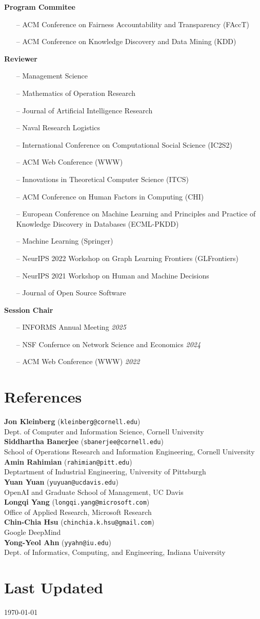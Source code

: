 \documentclass[margin]{res}
\newcommand{\field}[2]{\noindent \textbf{#1} \hfill #2 \\}
\newcommand{\referee}[3]{\textbf{#1} (\texttt{#3})\\{#2}\smallskip \\}
\begin{document}
\begin{resume}
	\field{Program Commitee}{}{
	\begin{itemize}[nosep]
		\item[--] ACM Conference on Fairness Accountability and Transparency (FAccT)
		\item[--] ACM Conference on Knowledge Discovery and Data Mining (KDD) 
	\end{itemize}}
	\field{Reviewer}{}{ 
	\begin{itemize}[nosep]
		\item[--] Management Science
		\item[--] Mathematics of Operation Research
		\item[--] Journal of Artificial Intelligence Research	\item[--] Naval Research Logistics 
		\item[--] International Conference on Computational Social Science (IC2S2)
		\item[--] ACM Web Conference (WWW) 
		\item[--] Innovations in Theoretical Computer Science (ITCS) 		\item[--] ACM Conference on Human Factors in Computing (CHI) 
		\item[--] European Conference on Machine Learning and Principles and Practice of Knowledge Discovery in Databases (ECML-PKDD) 
		\item[--] Machine Learning (Springer)
		\item[--] NeurIPS 2022 Workshop on Graph Learning Frontiers (GLFrontiers)
		\item[--] NeurIPS 2021 Workshop on Human and Machine Decisions 
		\item[--] Journal of Open Source Software
	\end{itemize}}
	\field{Session Chair}{}{ 
	\begin{itemize}[nosep]
		\item[--] INFORMS Annual Meeting \hfill \emph{2025}
		\item[--] NSF Confernce on Network Science and Economics \hfill \emph{2024}
		\item[--] ACM Web Conference (WWW) \hfill \emph{2022}
	\end{itemize}}
	
\section{References} \referee{Jon Kleinberg}{Dept. of Computer and Information Science, Cornell University}{kleinberg@cornell.edu}
\referee{Siddhartha Banerjee}{School of Operations Research and Information Engineering, Cornell University}{sbanerjee@cornell.edu}
\referee{Amin Rahimian}{Deptartment of Industrial Engineering, University of Pittsburgh}{rahimian@pitt.edu}
\referee{Yuan Yuan}{OpenAI and Graduate School of Management, UC Davis}{yuyuan@ucdavis.edu}
\referee{Longqi Yang}{Office of Applied Research, Microsoft Research}{longqi.yang@microsoft.com}
\referee{Chin-Chia Hsu}{Google DeepMind}{chinchia.k.hsu@gmail.com}
\referee{Yong-Yeol Ahn}{Dept. of Informatics, Computing, and Engineering, Indiana University}{yyahn@iu.edu}

 \section{Last Updated} \today


\end{resume}
\end{document}
